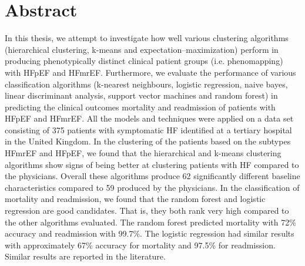 \documentclass[../thesis.tex]{subfiles}
\begin{document}
\chapter*{Abstract}

\noindent In this thesis, we attempt to investigate how well various clustering algorithms (hierarchical clustering, k-means and expectation–maximization) perform in producing phenotypically distinct clinical patient groups (i.e. phenomapping) with HFpEF and HFmrEF. Furthermore, we evaluate the performance of various classification algorithms (k-nearest neighbours, logistic regression, naive bayes, linear discriminant analysis, support vector machines and random forest) in predicting the clinical outcomes mortality and readmission of patients with HFpEF and HFmrEF. All the models and techniques were applied on a data set consisting of 375 patients with symptomatic HF identified at a tertiary hospital in the United Kingdom. In the clustering of the patients based on the subtypes HFmrEF and HFpEF, we found that the hierarchical and k-means clustering algorithms show signs of being better at clustering patients with HF compared to the physicians. Overall these algorithms produce 62 significantly different baseline characteristics compared to 59 produced by the physicians. In the classification of mortality and readmission, we found that the random forest and logistic regression are good candidates. That is, they both rank very high compared to the other algorithms evaluated. The random forest predicted mortality with 72\% accuracy and readmission with 99.7\%. The logistic regression had similar results with approximately 67\% accuracy for mortality and 97.5\% for readmission. Similar results are reported in the literature.
\end{document}
